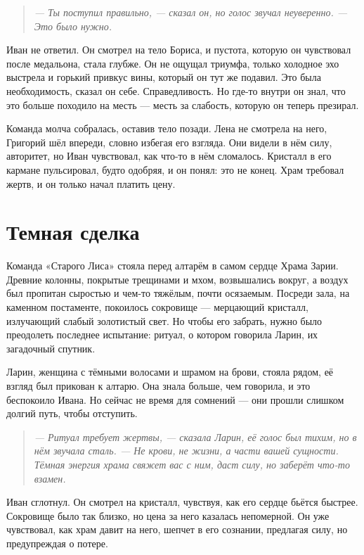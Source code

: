 \documentclass[12pt,a4paper]{book}
\newenvironment{dialogue}{\begin{quote}\itshape}{\end{quote}}
\begin{document}
\begin{dialogue}
--- Ты поступил правильно, --- сказал он, но голос звучал неуверенно. --- Это было нужно.
\end{dialogue}

Иван не ответил. Он смотрел на тело Бориса, и пустота, которую он чувствовал после медальона, стала глубже. Он не ощущал триумфа, только холодное эхо выстрела и горький привкус вины, который он тут же подавил. Это была необходимость, сказал он себе. Справедливость. Но где-то внутри он знал, что это больше походило на месть --- месть за слабость, которую он теперь презирал.

Команда молча собралась, оставив тело позади. Лена не смотрела на него, Григорий шёл впереди, словно избегая его взгляда. Они видели в нём силу, авторитет, но Иван чувствовал, как что-то в нём сломалось. Кристалл в его кармане пульсировал, будто одобряя, и он понял: это не конец. Храм требовал жертв, и он только начал платить цену.

\chapter{Темная сделка}

Команда «Старого Лиса» стояла перед алтарём в самом сердце Храма Зарии. Древние колонны, покрытые трещинами и мхом, возвышались вокруг, а воздух был пропитан сыростью и чем-то тяжёлым, почти осязаемым. Посреди зала, на каменном постаменте, покоилось сокровище --- мерцающий кристалл, излучающий слабый золотистый свет. Но чтобы его забрать, нужно было преодолеть последнее испытание: ритуал, о котором говорила Ларин, их загадочный спутник.

Ларин, женщина с тёмными волосами и шрамом на брови, стояла рядом, её взгляд был прикован к алтарю. Она знала больше, чем говорила, и это беспокоило Ивана. Но сейчас не время для сомнений --- они прошли слишком долгий путь, чтобы отступить.

\begin{dialogue}
--- Ритуал требует жертвы, --- сказала Ларин, её голос был тихим, но в нём звучала сталь. --- Не крови, не жизни, а части вашей сущности. Тёмная энергия храма свяжет вас с ним, даст силу, но заберёт что-то взамен.
\end{dialogue}

Иван сглотнул. Он смотрел на кристалл, чувствуя, как его сердце бьётся быстрее. Сокровище было так близко, но цена за него казалась непомерной. Он уже чувствовал, как храм давит на него, шепчет в его сознании, предлагая силу, но предупреждая о потере.
\end{document}
